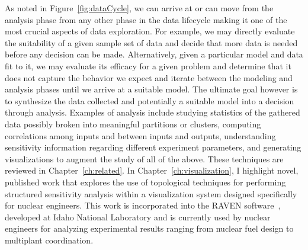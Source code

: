 As noted in Figure~\ref{fig:dataCycle}, we can arrive at or can move from the analysis phase from any other phase in the data lifecycle making it one of the most crucial aspects of data exploration.
%
For example, we may directly evaluate the suitability of a given sample set of data and decide that more data is needed before any decision can be made.
%
Alternatively, given a particular model and data fit to it, we may evaluate its efficacy for a given problem and determine that it does not capture the behavior we expect and iterate between the modeling and analysis phases until we arrive at a suitable model.
%
The ultimate goal however is to synthesize the data collected and potentially a suitable model into a decision through analysis.
%
Examples of analysis include studying statistics of the gathered data possibly broken into meaningful partitions or clusters, computing correlations among inputs and between inputs and outputs, understanding sensitivity information regarding different experiment parameters, and generating visualizations to augment the study of all of the above.
%
These techniques are reviewed in Chapter~\ref{ch:related}.
%
In Chapter~\ref{ch:visualization}, I highlight novel, published work that explores the use of topological techniques for performing structured sensitivity analysis within a visualization system designed specifically for nuclear engineers.
%
This work is incorporated into the RAVEN software~\cite{RabitiAlfonsiCogliati2015}, developed at Idaho National Laboratory and is currently used by nuclear engineers for analyzing experimental results ranging from nuclear fuel design to multiplant coordination.

% 